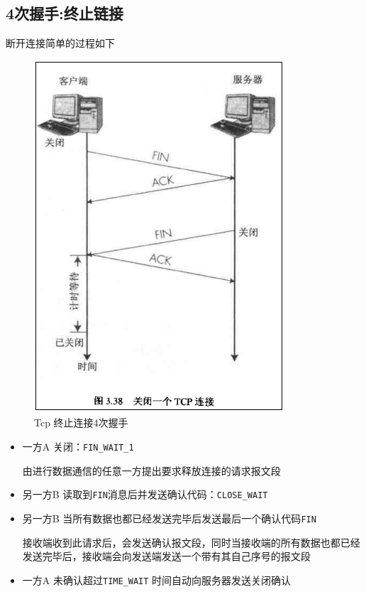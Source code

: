 \documentclass[UTF8,a4paper,12pt]{ctexbook}
\begin{document}
		\subsection{4次握手:终止链接}
			断开连接简单的过程如下
			\begin{figure}[ht]
				\centering
				\includegraphics[scale = 0.7]{figures/Tcp-close.png}
				\caption{Tcp 终止连接4次握手}
				\label{tcpClose}
			\end{figure}
			
			\begin{itemize}
				\item 一方A 关闭：\verb|FIN_WAIT_1|
				
					由进行数据通信的任意一方提出要求释放连接的请求报文段
					
				\item 另一方B 读取到\verb|FIN|消息后并发送确认代码：\verb|CLOSE_WAIT|
				
				\item 另一方B 当所有数据也都已经发送完毕后发送最后一个确认代码\verb|FIN|
				
					接收端收到此请求后，会发送确认报文段，同时当接收端的所有数据也都已经发送完毕后，接收端会向发送端发送一个带有其自己序号的报文段
					
				\item 一方A 未确认超过\verb|TIME_WAIT| 时间自动向服务器发送关闭确认
			\end{itemize}
		
\end{document}
